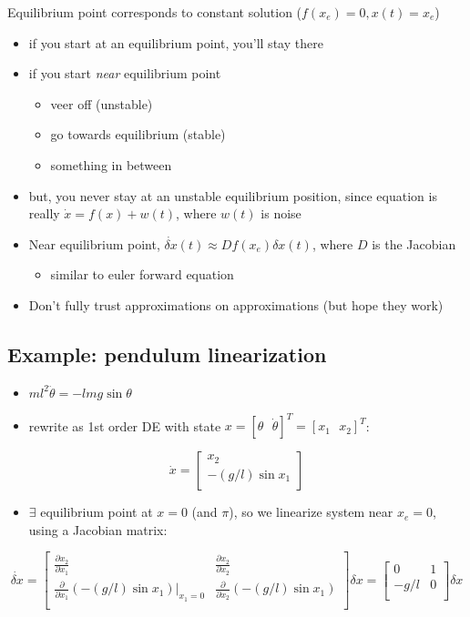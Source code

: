 \documentclass[10pt,letterpaper]{article}
\begin{document}
Equilibrium point corresponds to constant solution ($f(x_e)= 0, x(t)=x_e$)
\begin{itemize}
\item if you start at an equilibrium point, you'll stay there
\item if you start \emph{near} equilibrium point

\begin{itemize}
\item veer off (unstable)
\item go towards equilibrium (stable)
\item something in between
\end{itemize}

\item but, you never stay at an unstable equilibrium position, since equation is really $\dot x = f(x) + w(t)$, where $w(t)$ is noise
\item Near equilibrium point, $\dot{\delta x}(t) \approx Df(x_e) \delta x(t)$, where $D$ is the Jacobian

\begin{itemize}
\item similar to euler forward equation
\end{itemize}

\item Don't fully trust approximations on approximations (but hope they work)
\end{itemize}
\subsection{Example: pendulum linearization}
\label{sec-8_7}

\begin{itemize}
\item $ml ^{2} \ddot{\theta}=-lmg \sin \theta$
\item rewrite as 1st order DE with state $x=[\theta \text{ } \dot \theta] ^{T} = [x_1 \text{ } x_2] ^{T}$:
\end{itemize}
$$
\dot x =
\begin{bmatrix}
  x _{2}          \\
  -(g/l) \sin x_1 \\
\end{bmatrix}
$$ 
\begin{itemize}
\item $\exists$ equilibrium point at $x=0$ (and $\pi$), so we linearize system near $x _{e} =0$, using a Jacobian matrix:
\end{itemize}
$$
\dot{\delta x}=
\begin{bmatrix}
  \frac{\partial x_2}{\partial x_1}               & \frac{\partial x_2}{\partial x_2}               \\
  \frac{\partial}{\partial x_1} \left(-(g/l) \sin x_1 \right)|_{x_1=0} & \frac{\partial}{\partial x_2} (-(g/l) \sin x_1) \\
\end{bmatrix}
\delta x  
=
\begin{bmatrix}
     0 & 1 \\
  -g/l & 0 \\
\end{bmatrix}
\delta x  
$$
\end{document}
